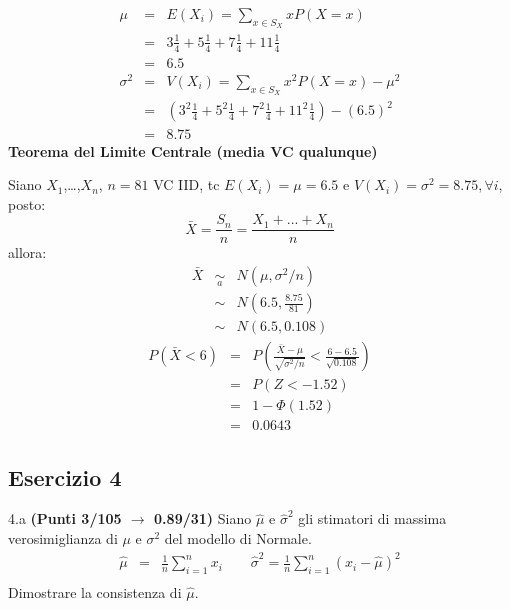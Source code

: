 \documentclass[
  11pt,
]{book}
\theoremstyle{mytheoremstyle}
\theoremstyle{mydefstyle}
\newenvironment{sol}
  {
  \begin{tcolorbox}[enhanced,breakable,arc=0.1mm,boxrule=1pt,colback=white,colframe=iblue,
  title=\bf \fontfamily{lmss}\selectfont \hspace{.5 cm} Soluzione,drop fuzzy shadow]

}{
\end{tcolorbox}
  }
\begin{document}
\begin{sol}
\begin{eqnarray*} \mu &=& E(X_i) = \sum_{x\in S_X}x P(X=x)\\ 
 &=&  3  \frac { 1 }{ 4 }+ 5  \frac { 1 }{ 4 }+ 7  \frac { 1 }{ 4 }+ 11  \frac { 1 }{ 4 } \\ 
            &=& 6.5 \\ 
 \sigma^2 &=& V(X_i) = \sum_{x\in S_X}x^2 P(X=x)-\mu^2\\ 
 &=&\left(  3  ^2\frac { 1 }{ 4 }+ 5  ^2\frac { 1 }{ 4 }+ 7  ^2\frac { 1 }{ 4 }+ 11  ^2\frac { 1 }{ 4 } \right)-( 6.5 )^2\\ 
            &=& 8.75 
\end{eqnarray*}
\textbf{Teorema del Limite Centrale (media VC qualunque)}

Siano \(X_1\),\ldots,\(X_n\), \(n=81\) VC IID, tc \(E(X_i)=\mu=6.5\) e \(V(X_i)=\sigma^2=8.75,\forall i\), posto:
\[
      \bar X=\frac{S_n}n =\frac{X_1 + ... + X_n}n
      \]
allora:\begin{eqnarray*}
  \bar X & \mathop{\sim}\limits_{a}& N(\mu,\sigma^2/n) \\
     &\sim & N\left(6.5,\frac{8.75}{81}\right) \\
     &\sim & N(6.5,0.108)
  \end{eqnarray*}\begin{eqnarray*}
      P( \bar X   <   6 ) 
        &=& P\left(  \frac { \bar X  -  \mu }{ \sqrt{\sigma^2/n} }  <  \frac { 6  -  6.5 }{\sqrt{ 0.108 }} \right)  \\
                 &=& P\left(  Z   <   -1.52 \right) \\    
                 &=&  1-\Phi( 1.52 ) \\ &=&  0.0643 
      \end{eqnarray*}

\end{sol}

\subsection{Esercizio 4}\label{esercizio-4-31}

4.a \textbf{(Punti 3/105 \(\rightarrow\) 0.89/31)} Siano \(\hat \mu\) e \(\hat\sigma^2\) gli stimatori di massima verosimiglianza di \(\mu\) e \(\sigma^2\) del modello di Normale.
\begin{eqnarray*}
  \hat\mu &=&  \frac 1n\sum_{i=1}^nx_i \qquad \hat\sigma^2 =  \frac 1n\sum_{i=1}^n(x_i-\hat\mu)^2\\
\end{eqnarray*}
Dimostrare la consistenza di \(\hat\mu\).
\end{document}
